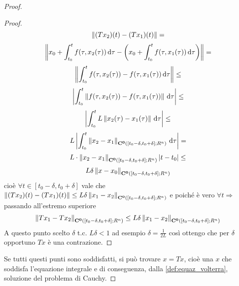 \begin{proof}
\begin{itemize}
\begin{proof}
			$$\left\|(Tx_2)(t) - (Tx_1)(t)\right\|=$$
			$$\left\|x_0+\int_{t_0}^t f(\tau,x_2(\tau)) \,\mathrm{d}{\tau} - \left(x_0+\int_{t_0}^t f(\tau,x_1(\tau)) \,\mathrm{d}{\tau}\right)\right\|=$$
			$$\left\|\int_{t_0}^t f(\tau,x_2(\tau))-f(\tau,x_1(\tau)) \,\mathrm{d}{\tau}\right\|\le$$
			$$\left|\int_{t_0}^t \left\|f(\tau,x_2(\tau))-f(\tau,x_1(\tau))\right\| \,\mathrm{d}{\tau}\right|\le$$
			$$\left|\int_{t_0}^t L\left\|x_2(\tau)-x_1(\tau)\right\| \,\mathrm{d}{\tau}\right|\le$$
			$$L\left|\int_{t_0}^t \left\|x_2-x_1\right\|_{\mathbf{C^{0}}(\left[t_0-\delta,t_0+\delta\right];R^n)} \,\mathrm{d}{\tau}\right|=$$
			$$L\cdot \left\|x_2-x_1\right\|_{\mathbf{C^{0}}(\left[t_0-\delta,t_0+\delta\right];R^n)}\left|t-t_0\right|\le$$
			$$L\delta\left\|x-x_0\right\|_{\mathbf{C^{0}}(\left[t_0-\delta,t_0+\delta\right];R^n)}$$
			cioè $\forall t \in \left[t_0-\delta,t_0+\delta\right]$ vale che $\left\|(Tx_2)(t)-(Tx_1)(t)\right\|\le L\delta\left\|x_1-x_2\right\|_{\mathbf{C^{0}}(\left[t_0-\delta,t_0+\delta\right];R^n)}$ e poiché è vero $\forall t \Rightarrow $ passando all'estremo superiore
			$$ \left\|Tx_1 - Tx_2\right\|_{\mathbf{C^{0}}(\left[t_0-\delta,t_0+\delta\right];R^n)}\le L\delta\left\|x_1-x_2\right\|_{\mathbf{C^{0}}(\left[t_0-\delta,t_0+\delta\right];R^n)}$$
			A questo punto scelto $\delta$ t.c. $L\delta<1$ ad esempio $\delta=\frac{1}{2L}$ così ottengo che per $\delta$ opportuno $Tx$ è una contrazione.
		\end{proof}
	\end{itemize}
	Se tutti questi punti sono soddisfatti, si può trovare $x=Tx$, cioè una $x$ che soddisfa l'equazione integrale e di conseguenza, dalla \ref{def:equaz_volterra}, soluzione del problema di Cauchy.











\end{proof}
